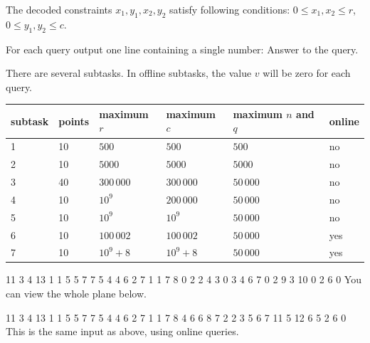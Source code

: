 The decoded constraints $x_1, y_1, x_2, y_2$ satisfy following conditions:
$0 \leq x_1, x_2 \leq r$, $0 \leq y_1, y_2 \leq c$. 


For each query output one line containing a single number: Answer to the query.


There are several subtasks. In offline subtasks, the value $v$ will be zero for each query. 

\bigskip

\begin{center}
\begin{tabular}{|l|l|l|l|l|l|}
\hline
subtask & points & maximum $r$  & maximum $c$   & maximum $n$ and $q$ & online    \\ \hline
1       & 10     & $500$        & $500$         & $500$     & no        \\ \hline
2       & 10     & $5000$       & $5000$        & $5000$    & no        \\ \hline
3       & 40     & $300\,000$   & $300\,000$    & $50\,000$ & no        \\ \hline
4       & 10     & $10^9$       & $200\,000$    & $50\,000$ & no        \\ \hline
5       & 10     & $10^9$       & $10^9$        & $50\,000$ & no        \\ \hline
6       & 10     & $100\,002$   & $100\,002$    & $50\,000$ & yes       \\ \hline
7       & 10     & $10^9 + 8$   & $10^9 + 8$    & $50\,000$ & yes       \\ \hline
\end{tabular}
\end{center}



 11 3 4 13
1 1 5 5
7 7 5 4
4 6 2 7
1 1 7 8 0
2 2 4 3 0
3 4 6 7 0
2 9 3 10 0
2
6
0
\sampleCOMMENT
You can view the whole plane below.
\sampleEND
{}

 11 3 4 13
1 1 5 5
7 7 5 4
4 6 2 7
1 1 7 8 4
6 6 8 7 2
2 3 5 6 7
11 5 12 6 5
2
6
0
\sampleCOMMENT
This is the same input as above, using online queries.
\sampleEND

